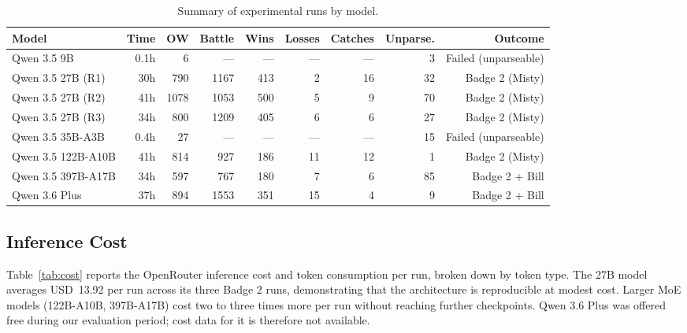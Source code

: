 \documentclass{article}
\begin{document}
\begin{table}[h]
\centering
\small
\caption{Summary of experimental runs by model.}
\label{tab:summary}
\begin{tabular}{lrrrrrrrr}
\toprule
Model & Time & OW & Battle & Wins & Losses & Catches & Unparse. & Outcome \\
\midrule
Qwen 3.5 9B       & 0.1h &   6 &   --- & --- & --- & --- &  3 & Failed (unparseable) \\
Qwen 3.5 27B (R1) &  30h & 790 & 1167  & 413 &   2 &  16 & 32 & Badge 2 (Misty) \\
Qwen 3.5 27B (R2) &  41h & 1078 & 1053 & 500 &   5 &   9 & 70 & Badge 2 (Misty) \\
Qwen 3.5 27B (R3) &  34h & 800 & 1209  & 405 &   6 &   6 & 27 & Badge 2 (Misty) \\
Qwen 3.5 35B-A3B  & 0.4h &  27 &   --- & --- & --- & --- & 15 & Failed (unparseable) \\
Qwen 3.5 122B-A10B &  41h & 814 &  927  & 186 &  11 &  12 &  1 & Badge 2 (Misty) \\
Qwen 3.5 397B-A17B &  34h & 597 &  767  & 180 &   7 &   6 & 85 & Badge 2 + Bill \\
Qwen 3.6 Plus     &  37h & 894 & 1553  & 351 &  15 &   4 &  9 & Badge 2 + Bill \\
\bottomrule
\end{tabular}
\end{table}

\subsection{Inference Cost}

Table~\ref{tab:cost} reports the OpenRouter inference cost and token consumption per run, broken down by token type. The 27B model averages USD~13.92 per run across its three Badge 2 runs, demonstrating that the architecture is reproducible at modest cost. Larger MoE models (122B-A10B, 397B-A17B) cost two to three times more per run without reaching further checkpoints. Qwen 3.6 Plus was offered free during our evaluation period; cost data for it is therefore not available.
\end{document}

